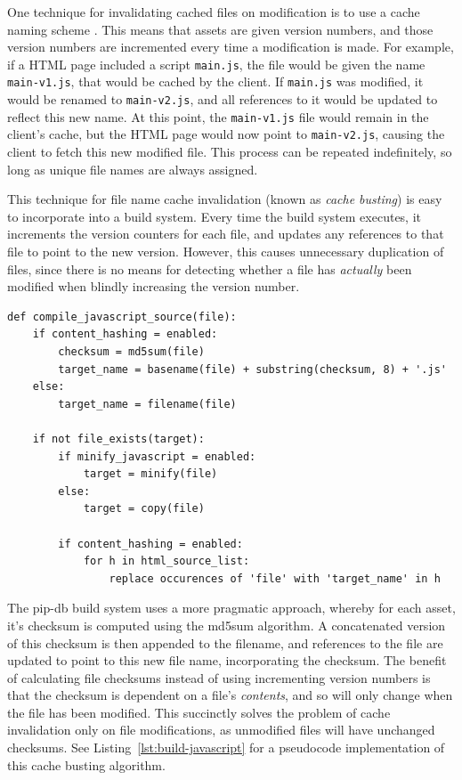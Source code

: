 One technique for invalidating cached files on modification is to use
a cache naming scheme \cite{kelly2002optimization}. This means that
assets are given version numbers, and those version numbers are
incremented every time a modification is made. For example, if a HTML
page included a script \texttt{main.js}, the file would be given the
name \texttt{main-v1.js}, that would be cached by the client. If
\texttt{main.js} was modified, it would be renamed to
\texttt{main-v2.js}, and all references to it would be updated to
reflect this new name. At this point, the \texttt{main-v1.js} file
would remain in the client's cache, but the HTML page would now point
to \texttt{main-v2.js}, causing the client to fetch this new modified
file. This process can be repeated indefinitely, so long as unique
file names are always assigned.

This technique for file name cache invalidation (known as
\textit{cache busting}) is easy to incorporate into a build
system. Every time the build system executes, it increments the
version counters for each file, and updates any references to that
file to point to the new version. However, this causes unnecessary
duplication of files, since there is no means for detecting whether a
file has \textit{actually} been modified when blindly increasing the
version number.

\newpage
\lstset{language=python}
\begin{lstlisting}[label=lst:build-javascript,caption={
      [Pseudocode for compiling a JavaScript source]
       Pseudocode listing for compiling a JavaScript source, with
       optional content hashing and minification.}]
def compile_javascript_source(file):
    if content_hashing = enabled:
        checksum = md5sum(file)
        target_name = basename(file) + substring(checksum, 8) + '.js'
    else:
        target_name = filename(file)

    if not file_exists(target):
        if minify_javascript = enabled:
            target = minify(file)
        else:
            target = copy(file)

        if content_hashing = enabled:
            for h in html_source_list:
                replace occurences of 'file' with 'target_name' in h
\end{lstlisting}

The pip-db build system uses a more pragmatic approach, whereby for
each asset, it's checksum is computed using the md5sum algorithm. A
concatenated version of this checksum is then appended to the
filename, and references to the file are updated to point to this new
file name, incorporating the checksum. The benefit of calculating file
checksums instead of using incrementing version numbers is that the
checksum is dependent on a file's \textit{contents}, and so will only
change when the file has been modified. This succinctly solves the
problem of cache invalidation only on file modifications, as
unmodified files will have unchanged checksums. See
Listing~\ref{lst:build-javascript} for a pseudocode implementation of
this cache busting algorithm.

